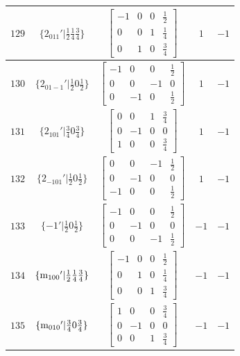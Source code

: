 \documentclass[fleqn,8pt]{jsarticle}
\begin{document}
\begin{longtable}{ccccc}
$ 129 $ & $ \{2{}_{011}{}'|\frac{1}{2} \frac{1}{4} \frac{3}{4}\} $ & $ \begin{bmatrix} -1 & 0 & 0 & \frac{1}{2} \\ 0 & 0 & 1 & \frac{1}{4} \\ 0 & 1 & 0 & \frac{3}{4} \end{bmatrix} $ & $ 1 $ & $ -1 $ \\ \hline
$ 130 $ & $ \{2{}_{01-1}{}'|\frac{1}{2} 0 \frac{1}{2}\} $ & $ \begin{bmatrix} -1 & 0 & 0 & \frac{1}{2} \\ 0 & 0 & -1 & 0 \\ 0 & -1 & 0 & \frac{1}{2} \end{bmatrix} $ & $ 1 $ & $ -1 $ \\ \hline
$ 131 $ & $ \{2{}_{101}{}'|\frac{3}{4} 0 \frac{3}{4}\} $ & $ \begin{bmatrix} 0 & 0 & 1 & \frac{3}{4} \\ 0 & -1 & 0 & 0 \\ 1 & 0 & 0 & \frac{3}{4} \end{bmatrix} $ & $ 1 $ & $ -1 $ \\ \hline
$ 132 $ & $ \{2{}_{-101}{}'|\frac{1}{2} 0 \frac{1}{2}\} $ & $ \begin{bmatrix} 0 & 0 & -1 & \frac{1}{2} \\ 0 & -1 & 0 & 0 \\ -1 & 0 & 0 & \frac{1}{2} \end{bmatrix} $ & $ 1 $ & $ -1 $ \\ \hline
$ 133 $ & $ \{-1{}'|\frac{1}{2} 0 \frac{1}{2}\} $ & $ \begin{bmatrix} -1 & 0 & 0 & \frac{1}{2} \\ 0 & -1 & 0 & 0 \\ 0 & 0 & -1 & \frac{1}{2} \end{bmatrix} $ & $ -1 $ & $ -1 $ \\ \hline
$ 134 $ & $ \{{\rm m}_{100}{}'|\frac{1}{2} \frac{1}{4} \frac{3}{4}\} $ & $ \begin{bmatrix} -1 & 0 & 0 & \frac{1}{2} \\ 0 & 1 & 0 & \frac{1}{4} \\ 0 & 0 & 1 & \frac{3}{4} \end{bmatrix} $ & $ -1 $ & $ -1 $ \\ \hline
$ 135 $ & $ \{{\rm m}_{010}{}'|\frac{3}{4} 0 \frac{3}{4}\} $ & $ \begin{bmatrix} 1 & 0 & 0 & \frac{3}{4} \\ 0 & -1 & 0 & 0 \\ 0 & 0 & 1 & \frac{3}{4} \end{bmatrix} $ & $ -1 $ & $ -1 $ \\ \hline

\end{longtable}
\end{document}

